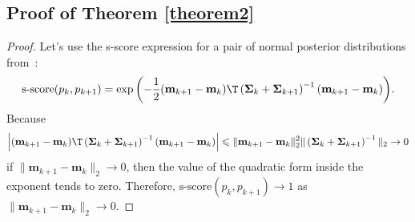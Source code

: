 \documentclass[sn-mathphys-num]{sn-jnl}%
\begin{document}
\begin{appendices}
\section{Proof of Theorem \ref{theorem2}}
\begin{proof}
Let's use the s-score expression for a pair of normal posterior distributions from~\cite{Aduenko2017}:
\[\text{s-score}(p_k, p_{k+1}) = \exp{\left( -\dfrac{1}{2} (\mathbf{m}_{k+1} - \mathbf{m}_k)\T \left( \mathbf{\Sigma}_k + \mathbf{\Sigma}_{k+1} \right)^{-1} (\mathbf{m}_{k+1} - \mathbf{m}_k) \right)}. \]
Because
    \[ \left| (\mathbf{m}_{k+1} - \mathbf{m}_k)\T \left( \mathbf{\Sigma}_k + \mathbf{\Sigma}_{k+1} \right)^{-1} (\mathbf{m}_{k+1} - \mathbf{m}_k) \right| \leqslant \| \mathbf{m}_{k+1} - \mathbf{m}_k \|_2^2 \| \left( \mathbf{\Sigma}_k + \mathbf{\Sigma}_{k+1} \right)^{-1} \|_2 \to 0 \]
    if $\|\mathbf{m}_{k+1} - \mathbf{m}_k\|_2\to 0$, then the value of the quadratic form inside the exponent tends to zero. Therefore, $\text{s-score}(p_k, p_{k+1}) \to 1$ as $\|\mathbf{m}_{k+1} - \mathbf{m}_k\|_2\to 0$.
\end{proof}


\end{appendices}
\end{document}
